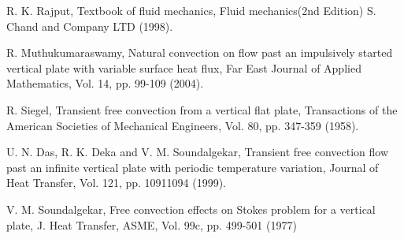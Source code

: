 \documentclass[11pt]{report}
\begin{document}
\begin{description}
		\item R. K. Rajput, Textbook of fluid mechanics, Fluid mechanics(2nd Edition) S. Chand and Company LTD (1998).
		
		\item R. Muthukumaraswamy, Natural convection on flow past an impulsively started vertical plate with variable surface heat flux, Far East Journal of Applied Mathematics, Vol. 14, pp. 99-109 (2004).
		
		\item R. Siegel, Transient free convection from a vertical flat plate, Transactions of the American Societies of Mechanical Engineers, Vol. 80, pp. 347-359 (1958).
		
		\item U. N. Das, R. K. Deka and V. M. Soundalgekar, Transient free convection flow past an infinite vertical plate with periodic temperature variation, Journal of Heat Transfer, Vol. 121, pp. 10911094 (1999).
		
		\item V. M. Soundalgekar, Free convection effects on Stokes problem for a vertical plate, J. Heat Transfer, ASME, Vol. 99c, pp. 499-501 (1977)
	\end{description}
\end{document}
